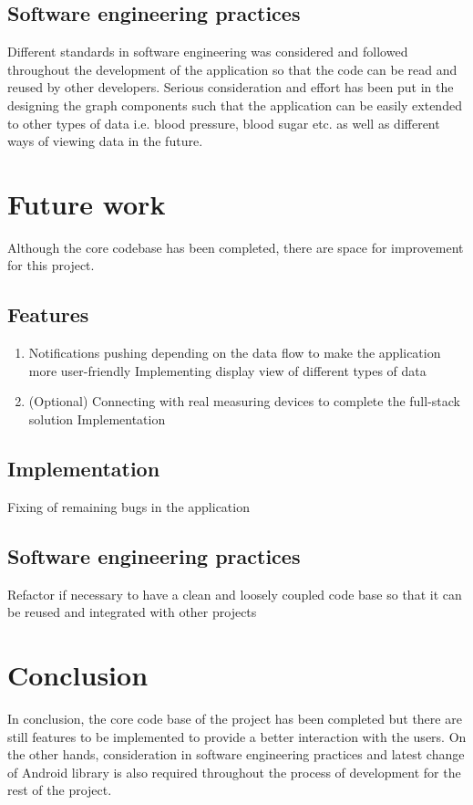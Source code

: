 \subsection{Software engineering practices}

Different standards in software engineering was considered and followed throughout the development of the application so that the code can be read and reused by other developers.
Serious consideration and effort has been put in the designing the graph components such that the application can be easily extended to other types of data i.e. blood pressure, blood sugar etc. as well as different ways of viewing data in the future.

\section{Future work}
\label{sec:Work done so far}

Although the core codebase has been completed, there are space for improvement for this project.
\subsection{Features}

\begin{enumerate}
\item Notifications pushing depending on the data flow to make the application more user-friendly
Implementing display view of different types of data
\item (Optional) Connecting with real measuring devices to complete the full-stack solution
Implementation
\end{enumerate}

\subsection{Implementation}

Fixing of remaining bugs in the application

\subsection{Software engineering practices}
Refactor if necessary to have a clean and loosely coupled code base so that it can be reused and integrated with other projects

\section{Conclusion}
In conclusion, the core code base of the project has been completed but there are still features to be implemented to provide a better interaction with the users.
On the other hands, consideration in software engineering practices and latest change of Android library is also required throughout the process of development for the rest of the project.

